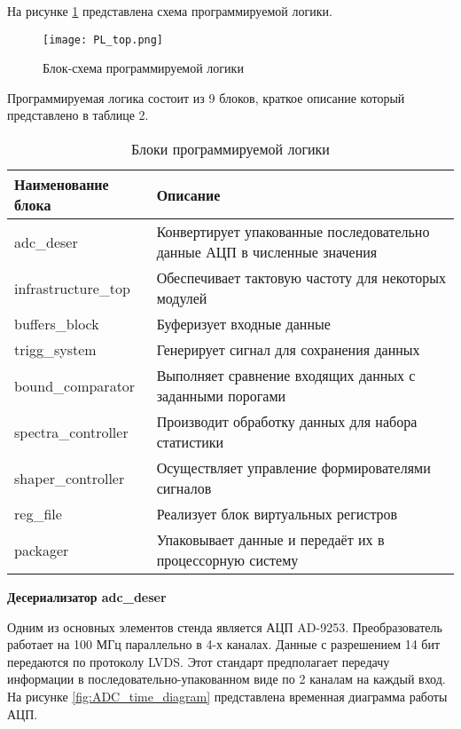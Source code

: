 На рисунке \ref{fig:PL_top} представлена схема программируемой логики.\par 
\begin{figure}[ht]
    \centering
    \texttt{[image: PL\_top.png]}
    \caption{Блок-схема программируемой логики}
    \label{fig:PL_top}
\end{figure}
Программируемая логика состоит из 9 блоков, краткое описание который представлено в таблице 2.\par%
\begin{table}[ht] \label{tab:PL_top_blocks}
    \caption{Блоки программируемой логики}
    \begin{tabular}{|p{}|p{}|}
        \hline
        Наименование блока & Описание \\
        \hline
        adc\_deser & Конвертирует упакованные последовательно данные АЦП в численные значения \\
        \hline
        infrastructure\_top & Обеспечивает тактовую частоту для некоторых модулей \\
        \hline
        buffers\_block & Буферизует входные данные \\
        \hline
        trigg\_system & Генерирует сигнал для сохранения данных \\
        \hline
        bound\_comparator & Выполняет сравнение входящих данных с заданными порогами \\
        \hline
        spectra\_controller & Производит обработку данных для набора статистики \\
        \hline
        shaper\_controller & Осуществляет управление формирователями сигналов \\
        \hline
        reg\_file & Реализует блок виртуальных регистров \\
        \hline
        packager & Упаковывает данные и передаёт их в процессорную систему \\
        \hline
    \end{tabular}
\end{table}
\textbf{Десериализатор adc\_deser}\par
Одним из основных элементов стенда является АЦП AD-9253. Преобразователь работает на 100 МГц параллельно в 4-х каналах. Данные с разрешением 14 бит передаются по протоколу LVDS. Этот стандарт предполагает передачу информации в последовательно-упакованном виде по 2 каналам на каждый вход. На рисунке \ref{fig:ADC_time_diagram} представлена временная диаграмма работы АЦП.\par
